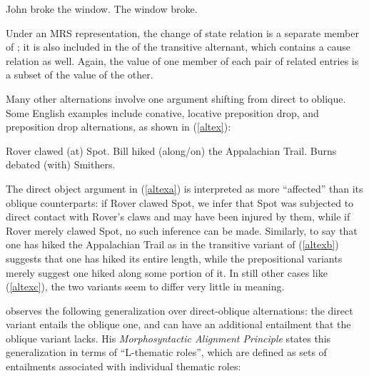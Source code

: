 \documentclass[output=paper
                ,modfonts
                ,nonflat
	        ,collection
	        ,collectionchapter
	        ,collectiontoclongg
 	        ,biblatex
                ,babelshorthands
                ,newtxmath
                ,draftmode
                ,colorlinks, citecolor=brown
]{./langsci/langscibook}
\begin{document}
\begin{exe}
\ex\label{caus-inch}
\begin{xlist}
	\ex\label{caus-inch-a}John broke the window.
	\ex\label{caus-inch-b}The window broke.
\end{xlist}	
\end{exe}

Under an MRS representation, the change of state relation is a separate member of \rels; it is also included in the \rels of the transitive alternant, which contains a cause relation as well.
Again, the \rels value of one member of each pair of related entries is a subset of the \rels value of the other.

Many other alternations involve one argument shifting from direct to oblique.
Some English examples include conative, locative preposition drop, and  preposition drop alternations, as shown in (\ref{altex}):

\begin{exe}\ex\label{altex}
\begin{xlist}
\ex \label{altexa} Rover clawed (at) Spot. 
\ex \label{altexb} Bill hiked (along/on) the Appalachian Trail.
\ex \label{altexc} Burns debated (with) Smithers.
\end{xlist}
\end{exe}

\noindent
The direct object argument in (\ref{altexa}) is interpreted as more ``affected'' than its oblique counterparts:  if Rover clawed Spot, we infer that Spot was subjected to direct contact with Rover's claws and may have been injured by them, while if Rover merely clawed  Spot, no such inference can be made.
Similarly, to say that one has hiked the Appalachian Trail as in the transitive variant of (\ref{altexb}) suggests that one has hiked its entire length, while the prepositional variants merely suggest one hiked along some portion of it.  In still other cases like (\ref{altexc}), the two variants seem to differ very little in meaning.  


\citet{Beavers2010} observes the following generalization over direct-oblique alternations:  the direct variant entails the oblique one, and can have an additional entailment that the oblique variant lacks.  
His \emph{Morphosyntactic Alignment Principle}  states this generalization in terms of ``L-thematic roles'', which are defined as sets of entailments associated with individual thematic roles:   
\end{document}
